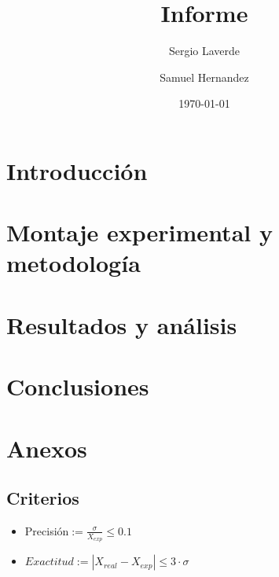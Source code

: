 \documentclass[a4paper, reprint, showkeys, nofootinbib, twoside]{revtex4-1}
\begin{document}
\title{Informe}


\author{Sergio Laverde}

\author{Samuel Hernandez}


\date{\today}


\begin{abstract}

\end{abstract}

\maketitle

\section{Introducción}

\section{Montaje experimental y metodología}

\section{Resultados y análisis}

\section{Conclusiones}




\section{Anexos}

\subsection{Criterios}
\label{Criterios}
\begin{itemize}
    \item 
Precisión$:=\frac{\sigma}{X_{exp}}\leq 0.1$
    \item 
$Exactitud:=\left| X_{real} - X_{exp} \right| \leq 3\cdot \sigma$
\end{itemize}
\end{document}

